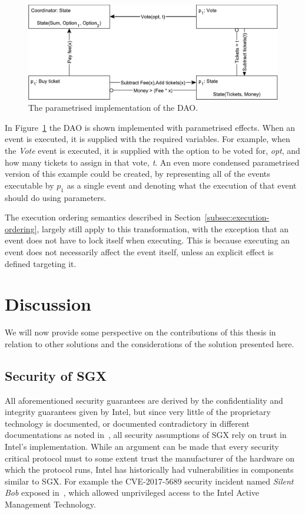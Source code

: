 \documentclass{article}
\begin{document}
	\begin{figure}[ht]
  	\includegraphics[width=\textwidth]{figures/dcr-graphs/dao-parametrised.pdf}
	  \caption{The parametrised implementation of the DAO.}
	  \label{fig:dao-parametrised}
	\end{figure}
	\FloatBarrier

	In Figure~\ref{fig:dao-parametrised} the DAO is shown implemented with parametrised effects.
	When an event is executed, it is supplied with the required variables.
	For example, when the \textit{Vote} event is executed, it is supplied with the option to be voted for, \textit{opt}, and how many tickets to assign in that vote, \textit{t}.
	An even more condensed parametrised version of this example could be created, by representing all of the events executable by $p_1$ as a single event and denoting what the execution of that event should do using parameters.

	The execution ordering semantics described in Section~\ref{subsec:execution-ordering}, largely still apply to this transformation, with the exception that an event does not have to lock itself when executing.
	This is because executing an event does not necessarily affect the event itself, unless an explicit effect is defined targeting it.

	\section{Discussion}

	We will now provide some perspective on the contributions of this thesis in relation to other solutions and the considerations of the solution presented here.

    \subsection{Security of SGX}

	All aforementioned security guarantees are derived by the confidentiality and integrity guarantees given by Intel, but since very little of the proprietary technology is documented, or documented contradictory in different documentations as noted in~\cite{costan_intel_2016}, all security assumptions of SGX rely on trust in Intel's implementation.
    While an argument can be made that every security critical protocol must to some extent trust the manufacturer of the hardware on which the protocol runs, Intel has historically had vulnerabilities in components similar to SGX.
    For example the CVE-2017-5689 security incident named \textit{Silent Bob} exposed in~\cite{silent_bob}, which allowed unprivileged access to the Intel Active Management Technology.
\end{document}
